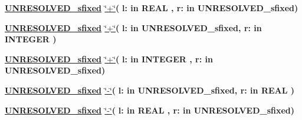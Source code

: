 \begin{DoxyCompactItemize}
\item 
{\bfseries {\bfseries {\bfseries \hyperlink{classfixed__pkg_aa723b28a027c3c0f9bca02d75e8df4d6}{U\+N\+R\+E\+S\+O\+L\+V\+E\+D\+\_\+sfixed}} \textcolor{vhdlchar}{ }}} \hyperlink{classfixed__pkg_a85a3dc07f1049b4642e6c837673edf13}{\char`\"{}+\char`\"{}}{\bfseries  ( }{\bfseries \textcolor{vhdlchar}{l\+: }\textcolor{stringliteral}{in }{\bfseries \textcolor{comment}{R\+E\+A\+L}\textcolor{vhdlchar}{ }}}{\bfseries  , \textcolor{vhdlchar}{r\+: }\textcolor{stringliteral}{in }\textcolor{vhdlchar}{U\+N\+R\+E\+S\+O\+L\+V\+E\+D\+\_\+sfixed}}{\bfseries  )} 
\item 
{\bfseries {\bfseries {\bfseries \hyperlink{classfixed__pkg_aa723b28a027c3c0f9bca02d75e8df4d6}{U\+N\+R\+E\+S\+O\+L\+V\+E\+D\+\_\+sfixed}} \textcolor{vhdlchar}{ }}} \hyperlink{classfixed__pkg_a85a3dc07f1049b4642e6c837673edf13}{\char`\"{}+\char`\"{}}{\bfseries  ( }{\bfseries \textcolor{vhdlchar}{l\+: }\textcolor{stringliteral}{in }\textcolor{vhdlchar}{U\+N\+R\+E\+S\+O\+L\+V\+E\+D\+\_\+sfixed}}{\bfseries  , \textcolor{vhdlchar}{r\+: }\textcolor{stringliteral}{in }{\bfseries \textcolor{comment}{I\+N\+T\+E\+G\+E\+R}\textcolor{vhdlchar}{ }}}{\bfseries  )} 
\item 
{\bfseries {\bfseries {\bfseries \hyperlink{classfixed__pkg_aa723b28a027c3c0f9bca02d75e8df4d6}{U\+N\+R\+E\+S\+O\+L\+V\+E\+D\+\_\+sfixed}} \textcolor{vhdlchar}{ }}} \hyperlink{classfixed__pkg_a85a3dc07f1049b4642e6c837673edf13}{\char`\"{}+\char`\"{}}{\bfseries  ( }{\bfseries \textcolor{vhdlchar}{l\+: }\textcolor{stringliteral}{in }{\bfseries \textcolor{comment}{I\+N\+T\+E\+G\+E\+R}\textcolor{vhdlchar}{ }}}{\bfseries  , \textcolor{vhdlchar}{r\+: }\textcolor{stringliteral}{in }\textcolor{vhdlchar}{U\+N\+R\+E\+S\+O\+L\+V\+E\+D\+\_\+sfixed}}{\bfseries  )} 
\item 
{\bfseries {\bfseries {\bfseries \hyperlink{classfixed__pkg_aa723b28a027c3c0f9bca02d75e8df4d6}{U\+N\+R\+E\+S\+O\+L\+V\+E\+D\+\_\+sfixed}} \textcolor{vhdlchar}{ }}} \hyperlink{classfixed__pkg_ac2f01ba70fd51fb20393648e564e9cf8}{\char`\"{}-\/\char`\"{}}{\bfseries  ( }{\bfseries \textcolor{vhdlchar}{l\+: }\textcolor{stringliteral}{in }\textcolor{vhdlchar}{U\+N\+R\+E\+S\+O\+L\+V\+E\+D\+\_\+sfixed}}{\bfseries  , \textcolor{vhdlchar}{r\+: }\textcolor{stringliteral}{in }{\bfseries \textcolor{comment}{R\+E\+A\+L}\textcolor{vhdlchar}{ }}}{\bfseries  )} 
\item 
{\bfseries {\bfseries {\bfseries \hyperlink{classfixed__pkg_aa723b28a027c3c0f9bca02d75e8df4d6}{U\+N\+R\+E\+S\+O\+L\+V\+E\+D\+\_\+sfixed}} \textcolor{vhdlchar}{ }}} \hyperlink{classfixed__pkg_ac2f01ba70fd51fb20393648e564e9cf8}{\char`\"{}-\/\char`\"{}}{\bfseries  ( }{\bfseries \textcolor{vhdlchar}{l\+: }\textcolor{stringliteral}{in }{\bfseries \textcolor{comment}{R\+E\+A\+L}\textcolor{vhdlchar}{ }}}{\bfseries  , \textcolor{vhdlchar}{r\+: }\textcolor{stringliteral}{in }\textcolor{vhdlchar}{U\+N\+R\+E\+S\+O\+L\+V\+E\+D\+\_\+sfixed}}{\bfseries  )} 

\end{DoxyCompactItemize}
